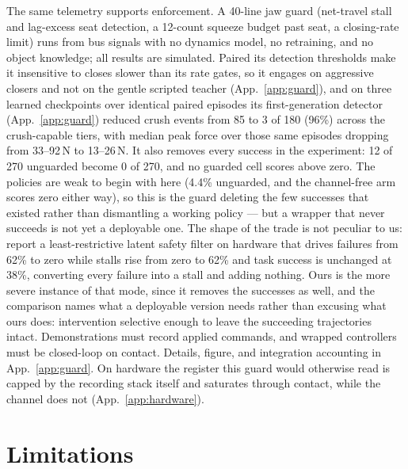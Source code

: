 \documentclass{article}
\begin{document}
The same telemetry supports enforcement. A 40-line jaw guard (net-travel
stall and lag-excess seat detection, a 12-count squeeze budget past seat,
a closing-rate limit) runs from bus signals with no dynamics model, no
retraining, and no object knowledge; all results are simulated. Paired
its detection thresholds make it insensitive to closes slower than its
rate gates, so it engages on aggressive closers and not on the gentle
scripted teacher (App.~\ref{app:guard}), and on three learned checkpoints
over identical paired episodes its
first-generation detector (App.~\ref{app:guard}) reduced crush events
from 85 to 3 of 180 (96\%) across the crush-capable tiers, with median
peak force over those same episodes dropping from 33--92\,N to
13--26\,N. It also removes every success in the experiment: 12 of 270
unguarded become 0 of 270, and no guarded cell scores above zero. The
policies are weak to begin with here (4.4\% unguarded, and the
channel-free arm scores zero either way), so this is the guard deleting
the few successes that existed rather than dismantling a working policy
--- but a wrapper that never succeeds is not yet a deployable one. The
shape of the trade is not peculiar to us: \citet{nakamura2025latentcbf}
report a least-restrictive latent safety filter on hardware that drives
failures from 62\% to zero while stalls rise from zero to 62\% and task
success is unchanged at 38\%, converting every failure into a stall and
adding nothing. Ours is the more severe instance of that mode, since it
removes the successes as well, and the comparison names what a deployable
version needs rather than excusing what ours does: intervention selective
enough to leave the succeeding trajectories intact. Demonstrations must record applied
commands, and wrapped controllers must be closed-loop on contact.
Details, figure, and integration accounting in App.~\ref{app:guard}. On
hardware the register this guard would otherwise read is capped by the
recording stack itself and saturates through contact, while the channel
does not (App.~\ref{app:hardware}).


\section{Limitations}
\label{sec:limitations}
\end{document}
